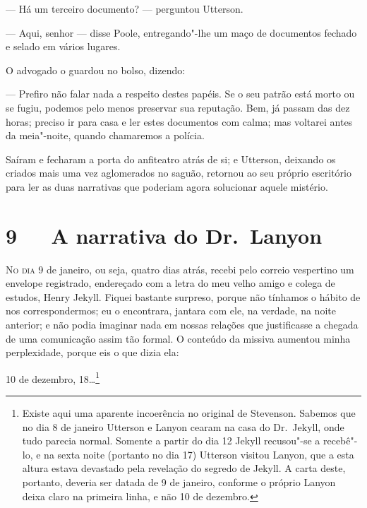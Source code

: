 --- Há um terceiro documento? --- perguntou Utterson. 

--- Aqui, senhor --- disse Poole, entregando"-lhe um maço de documentos
fechado e selado em vários lugares.

O advogado o guardou no bolso, dizendo:

--- Prefiro não falar nada a respeito destes papéis.  Se o seu patrão
está morto ou se fugiu, podemos pelo menos preservar sua reputação. 
Bem, já passam das dez horas; preciso ir para casa e ler estes
documentos com calma; mas voltarei antes da meia"-noite, quando
chamaremos a polícia.

Saíram e fecharam a porta do anfiteatro atrás de si; e Utterson,
deixando os criados mais uma vez aglomerados no saguão, retornou ao seu
próprio escritório para ler as duas narrativas que poderiam agora
solucionar aquele mistério.


\chapter[9\ \ \ A narrativa do Dr.~Lanyon]{9\ \ \ A narrativa do Dr.~Lanyon}

\textsc{No dia} 9 de janeiro, ou seja, quatro dias atrás, recebi pelo correio
vespertino um envelope registrado, endereçado com a letra do meu velho
amigo e colega de estudos, Henry Jekyll.  Fiquei bastante surpreso,
porque não tínhamos o hábito de nos correspondermos; eu o encontrara,
jantara com ele, na verdade, na noite anterior; e não podia imaginar
nada em nossas relações que justificasse a chegada de uma comunicação
assim tão formal.  O conteúdo da missiva aumentou minha perplexidade,
porque eis o que dizia ela:

10 de dezembro, 18\ldots{}\footnote{ Existe aqui uma aparente incoerência no original de Stevenson.  Sabemos
que no dia 8 de janeiro Utterson e Lanyon cearam na casa do Dr.~Jekyll,
onde tudo parecia normal.  Somente a partir do dia 12 Jekyll recusou"-se
a recebê"-lo, e na sexta noite (portanto no dia 17) Utterson visitou
Lanyon, que a esta altura estava devastado pela revelação do segredo
de Jekyll.  A carta deste, portanto, deveria ser datada de 9
de janeiro, conforme o próprio Lanyon deixa claro na primeira linha, e
não 10 de dezembro.}

